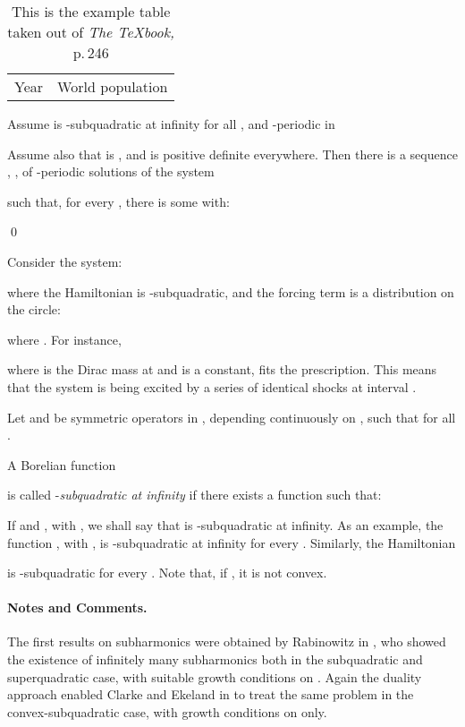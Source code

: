 \documentclass{llncs}
\begin{document}
\begin{table}
\caption{This is the example table taken out of {\it The
\TeX{}book,} p.\,246}
\begin{center}
\begin{tabular}{r@{\quad}rl}
\hline
\multicolumn{1}{l}{\rule{0pt}{12pt}
                   Year}&\multicolumn{2}{l}{World population}\2pt]
\hline
\end{tabular}
\end{center}
\end{table}
\begin{theorem} 
Assume  is
-subquadratic at
infinity for all , and -periodic in 





Assume also that  is , and  is positive definite
everywhere. Then there is a sequence , , of
-periodic solutions of the system

such that, for every , there is some  with:

\qed
\end{theorem}
\begin{example} 
Consider the system:

where the Hamiltonian  is
-subquadratic, and the
forcing term is a distribution on the circle:

where . For instance,

where  is the Dirac mass at  and
 is a
constant, fits the prescription. This means that the system
 is being excited by a
series of identical shocks at interval .
\end{example}
\begin{definition}
Let  and  be symmetric
operators in , depending continuously on
, such that
 for all .

A Borelian function

is called
-{\it subquadratic at infinity}
if there exists a function  such that:





If  and
, with
,
we shall say that  is
-subquadratic
at infinity. As an example, the function
, with
, is -subquadratic at infinity
for every . Similarly, the Hamiltonian

is -subquadratic for every .
Note that, if , it is not convex.
\end{definition}

\paragraph{Notes and Comments.}
The first results on subharmonics were
obtained by Rabinowitz in \cite{2rab}, who showed the existence of
infinitely many subharmonics both in the subquadratic and superquadratic
case, with suitable growth conditions on . Again the duality
approach enabled Clarke and Ekeland in \cite{2clar:eke:2} to treat the
same problem in the convex-subquadratic case, with growth conditions on
 only.
\end{document}
